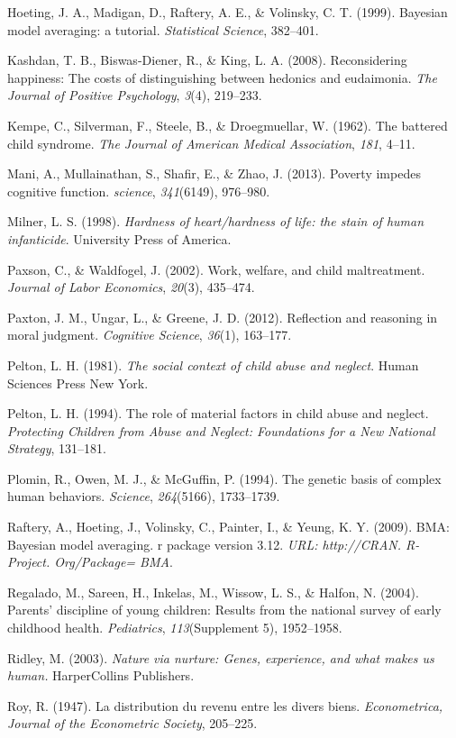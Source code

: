 \documentclass[]{elsarticle}
\begin{document}
Hoeting, J. A., Madigan, D., Raftery, A. E., \& Volinsky, C. T. (1999).
Bayesian model averaging: a tutorial. \emph{Statistical Science},
382--401.

Kashdan, T. B., Biswas-Diener, R., \& King, L. A. (2008). Reconsidering
happiness: The costs of distinguishing between hedonics and eudaimonia.
\emph{The Journal of Positive Psychology}, \emph{3}(4), 219--233.

Kempe, C., Silverman, F., Steele, B., \& Droegmuellar, W. (1962). The
battered child syndrome. \emph{The Journal of American Medical
Association}, \emph{181}, 4--11.

Mani, A., Mullainathan, S., Shafir, E., \& Zhao, J. (2013). Poverty
impedes cognitive function. \emph{science}, \emph{341}(6149), 976--980.

Milner, L. S. (1998). \emph{Hardness of heart/hardness of life: the
stain of human infanticide}. University Press of America.

Paxson, C., \& Waldfogel, J. (2002). Work, welfare, and child
maltreatment. \emph{Journal of Labor Economics}, \emph{20}(3), 435--474.

Paxton, J. M., Ungar, L., \& Greene, J. D. (2012). Reflection and
reasoning in moral judgment. \emph{Cognitive Science}, \emph{36}(1),
163--177.

Pelton, L. H. (1981). \emph{The social context of child abuse and
neglect}. Human Sciences Press New York.

Pelton, L. H. (1994). The role of material factors in child abuse and
neglect. \emph{Protecting Children from Abuse and Neglect: Foundations
for a New National Strategy}, 131--181.

Plomin, R., Owen, M. J., \& McGuffin, P. (1994). The genetic basis of
complex human behaviors. \emph{Science}, \emph{264}(5166), 1733--1739.

Raftery, A., Hoeting, J., Volinsky, C., Painter, I., \& Yeung, K. Y.
(2009). BMA: Bayesian model averaging. r package version 3.12.
\emph{URL: http://CRAN. R-Project. Org/Package= BMA}.

Regalado, M., Sareen, H., Inkelas, M., Wissow, L. S., \& Halfon, N.
(2004). Parents' discipline of young children: Results from the national
survey of early childhood health. \emph{Pediatrics},
\emph{113}(Supplement 5), 1952--1958.

Ridley, M. (2003). \emph{Nature via nurture: Genes, experience, and what
makes us human.} HarperCollins Publishers.

Roy, R. (1947). La distribution du revenu entre les divers biens.
\emph{Econometrica, Journal of the Econometric Society}, 205--225.
\end{document}
